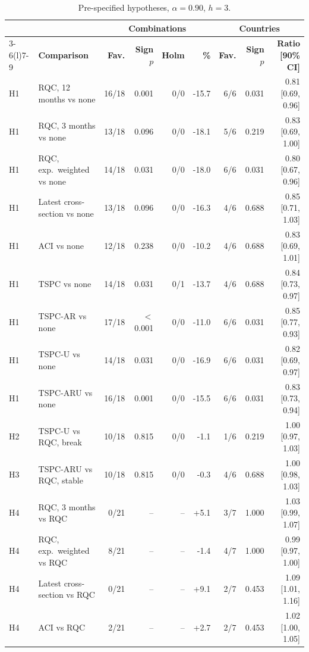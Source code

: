 \begin{table}[t]
\caption{Pre-specified hypotheses, $\alpha=0.90$, $h=3$.\label{tab:exthyp}}
\centering\footnotesize\setlength{\tabcolsep}{2pt}
\begin{tabular*}{\columnwidth}{@{\extracolsep\fill}llrrrrrrr@{}}
\toprule
 & & \multicolumn{4}{c}{\textbf{Combinations}} & \multicolumn{3}{c}{\textbf{Countries}} \\
\cmidrule(lr){3-6}\cmidrule(l){7-9}
 & \textbf{Comparison} & \textbf{Fav.} & \textbf{Sign $p$} & \textbf{Holm} & \textbf{\%} & \textbf{Fav.} & \textbf{Sign $p$} & \textbf{Ratio [90\% CI]} \\
\midrule
H1 & RQC, 12 months vs none & 16/18 & 0.001 & 0/0 & -15.7 & 6/6 & 0.031 & 0.81 [0.69, 0.96] \\
H1 & RQC, 3 months vs none & 13/18 & 0.096 & 0/0 & -18.1 & 5/6 & 0.219 & 0.83 [0.69, 1.00] \\
H1 & RQC, exp.\ weighted vs none & 14/18 & 0.031 & 0/0 & -18.0 & 6/6 & 0.031 & 0.80 [0.67, 0.96] \\
H1 & Latest cross-section vs none & 13/18 & 0.096 & 0/0 & -16.3 & 4/6 & 0.688 & 0.85 [0.71, 1.03] \\
H1 & ACI vs none & 12/18 & 0.238 & 0/0 & -10.2 & 4/6 & 0.688 & 0.83 [0.69, 1.01] \\
H1 & TSPC vs none & 14/18 & 0.031 & 0/1 & -13.7 & 4/6 & 0.688 & 0.84 [0.73, 0.97] \\
H1 & TSPC-AR vs none & 17/18 & $<$0.001 & 0/0 & -11.0 & 6/6 & 0.031 & 0.85 [0.77, 0.93] \\
H1 & TSPC-U vs none & 14/18 & 0.031 & 0/0 & -16.9 & 6/6 & 0.031 & 0.82 [0.69, 0.97] \\
H1 & TSPC-ARU vs none & 16/18 & 0.001 & 0/0 & -15.5 & 6/6 & 0.031 & 0.83 [0.73, 0.94] \\
\addlinespace
H2 & TSPC-U vs RQC, break & 10/18 & 0.815 & 0/0 & -1.1 & 1/6 & 0.219 & 1.00 [0.97, 1.03] \\
H3 & TSPC-ARU vs RQC, stable & 10/18 & 0.815 & 0/0 & -0.3 & 4/6 & 0.688 & 1.00 [0.98, 1.03] \\
\addlinespace
H4 & RQC, 3 months vs RQC & 0/21 & -- & -- & +5.1 & 3/7 & 1.000 & 1.03 [0.99, 1.07] \\
H4 & RQC, exp.\ weighted vs RQC & 8/21 & -- & -- & -1.4 & 4/7 & 1.000 & 0.99 [0.97, 1.00] \\
H4 & Latest cross-section vs RQC & 0/21 & -- & -- & +9.1 & 2/7 & 0.453 & 1.09 [1.01, 1.16] \\
H4 & ACI vs RQC & 2/21 & -- & -- & +2.7 & 2/7 & 0.453 & 1.02 [1.00, 1.05] \\

\end{tabular*}
\end{table}
